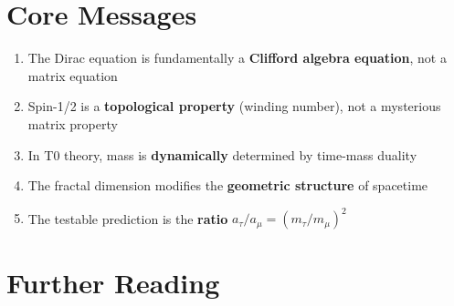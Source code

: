 	\begin{table}[h]
		\centering
		\caption{Comparison: Standard vs. T0 Dirac formulation}
	\end{table}
	
	\section{Core Messages}
	
	\begin{enumerate}
		\item The Dirac equation is fundamentally a \textbf{Clifford algebra equation}, 
		not a matrix equation
		
		\item Spin-1/2 is a \textbf{topological property} (winding number), 
		not a mysterious matrix property
		
		\item In T0 theory, mass is \textbf{dynamically} determined by 
		time-mass duality
		
		\item The fractal dimension modifies the \textbf{geometric structure} 
		of spacetime
		
		\item The testable prediction is the \textbf{ratio} 
		$a_\tau/a_\mu = (m_\tau/m_\mu)^2$
	\end{enumerate}
	
	\section*{Further Reading}
	
